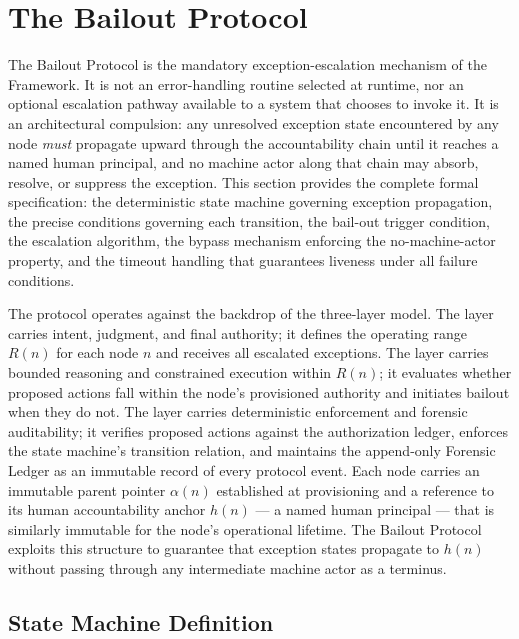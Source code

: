 \section{The Bailout Protocol}\label{sec:bailout}

The Bailout Protocol is the mandatory exception-escalation mechanism of the \bxthree{} Framework. It is not an error-handling routine selected at runtime, nor an optional escalation pathway available to a system that chooses to invoke it. It is an architectural compulsion: any unresolved exception state encountered by any \bxthree{} node \emph{must} propagate upward through the accountability chain until it reaches a named human principal, and no machine actor along that chain may absorb, resolve, or suppress the exception. This section provides the complete formal specification: the deterministic state machine governing exception propagation, the precise conditions governing each transition, the bail-out trigger condition, the escalation algorithm, the bypass mechanism enforcing the no-machine-actor property, and the timeout handling that guarantees liveness under all failure conditions.

The protocol operates against the backdrop of the \bxthree{} three-layer model. The \purpose{} layer carries intent, judgment, and final authority; it defines the operating range $R(n)$ for each node $n$ and receives all escalated exceptions. The \bounds{} layer carries bounded reasoning and constrained execution within $R(n)$; it evaluates whether proposed actions fall within the node's provisioned authority and initiates bailout when they do not. The \fact{} layer carries deterministic enforcement and forensic auditability; it verifies proposed actions against the authorization ledger, enforces the state machine's transition relation, and maintains the append-only Forensic Ledger as an immutable record of every protocol event. Each node carries an immutable parent pointer $\alpha(n)$ established at provisioning and a reference to its human accountability anchor $h(n)$ — a named human principal — that is similarly immutable for the node's operational lifetime. The Bailout Protocol exploits this structure to guarantee that exception states propagate to $h(n)$ without passing through any intermediate machine actor as a terminus.

\subsection{State Machine Definition}\label{sec:state-machine}

